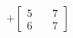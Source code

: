 \documentclass[preview]{standalone}
\begin{document}
\begin{align*}
+\begin{bmatrix} 5 & \quad 7 \\ 6 & \quad 7 \end{bmatrix}
\end{align*}
\end{document}
